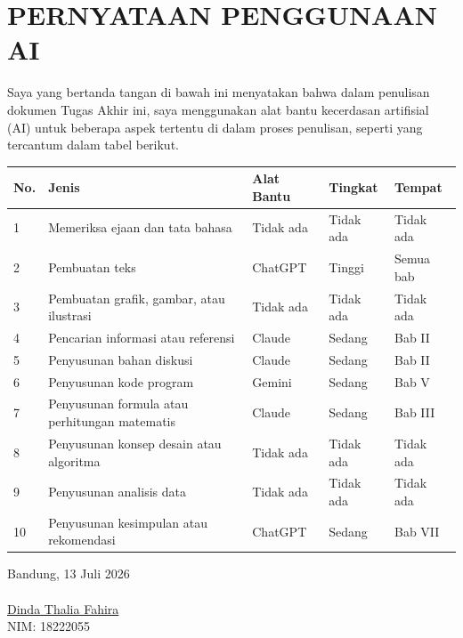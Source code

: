 \chapter*{PERNYATAAN PENGGUNAAN AI}
Saya yang bertanda tangan di bawah ini menyatakan bahwa dalam penulisan dokumen Tugas Akhir ini,
saya menggunakan alat bantu kecerdasan artifisial (AI) untuk beberapa aspek tertentu di dalam proses penulisan,
seperti yang tercantum dalam tabel berikut.
\begin{table}[h]
\begin{tabular}{|p{0.5cm}| p{4cm} | p{2.5cm} | p{2.5cm} | p{3cm} @{}| }
\hline
\textbf{No.} & \textbf{Jenis} & \textbf{Alat Bantu} & \textbf{Tingkat} & \textbf{Tempat}\\
\hline
1 & Memeriksa ejaan dan tata bahasa & Tidak ada & Tidak ada & Tidak ada \\
\hline
2 & Pembuatan teks & ChatGPT & Tinggi & Semua bab \\
\hline
3 & Pembuatan grafik, gambar, atau ilustrasi & Tidak ada & Tidak ada & Tidak ada \\
\hline
4 & Pencarian informasi atau referensi & Claude & Sedang & Bab II \\
\hline
5 & Penyusunan bahan diskusi & Claude & Sedang & Bab II \\
\hline
6 & Penyusunan kode program & Gemini & Sedang & Bab V \\
\hline
7 & Penyusunan formula atau perhitungan matematis & Claude & Sedang & Bab III \\
\hline
8 & Penyusunan konsep desain atau algoritma & Tidak ada & Tidak ada & Tidak ada \\
\hline
9 & Penyusunan analisis data & Tidak ada & Tidak ada & Tidak ada \\
\hline
10 & Penyusunan kesimpulan atau rekomendasi & ChatGPT & Sedang & Bab VII \\
\hline
\end{tabular}
\end{table}


Bandung, 13 Juli 2026\\
\\[2cm]

\underline{Dinda Thalia Fahira} \\
NIM: 18222055